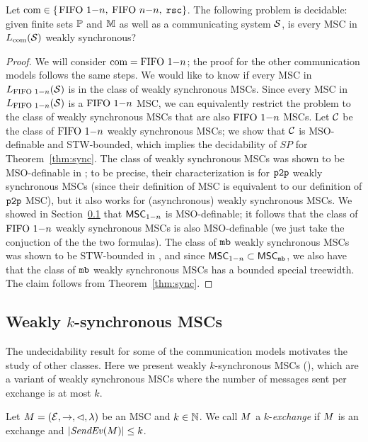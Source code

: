 \begin{proposition}\label{thm:weak-sync}
	Let $\textup{com} \in \{$$\text{FIFO } 1\mathsf{-}n, $ $\text{FIFO } n\mathsf{-}n, $ $\mathtt{rsc}\}$.
	The following problem is decidable:
	given finite sets $\mathbb{P}$ and $\mathbb{M}$ as well as a communicating system $\mathcal{S}$,
	is every MSC in $L_{\textup{com}}(\mathcal{S})$ weakly synchronous?
\end{proposition}
\begin{proof}
	We will consider $\textup{com} = \text{FIFO } 1\mathsf{-}n$; the proof for the other communication models follows the same steps. We would like to know if every MSC in $L_{\text{FIFO } 1\mathsf{-}n}(\mathcal{S})$ is in the class of weakly synchronous MSCs. Since every MSC in $L_{\text{FIFO } 1\mathsf{-}n}(\mathcal{S})$ is a $\text{FIFO } 1\mathsf{-}n$ MSC, we can equivalently restrict the problem to the class of weakly synchronous MSCs that are also $\text{FIFO } 1\mathsf{-}n$ MSCs. Let $\mathcal{C}$ be the class of $\text{FIFO } 1\mathsf{-}n$ weakly synchronous MSCs; we show that $\mathcal{C}$ is MSO-definable and STW-bounded, which implies the decidability of $SP$ for Theorem~\ref{thm:sync}. The class of weakly synchronous MSCs was shown to be MSO-definable in \cite{BolligFG21}; to be precise, their characterization is for $\mathtt{p2p}$ weakly synchronous MSCs (since their definition of MSC is equivalent to our definition of $\mathtt{p2p}$ MSC), but it also works for (asynchronous) weakly synchronous MSCs. We showed in Section~\ref{} that $\mathsf{MSC}_{1\mathsf{-}n}$ is MSO-definable; it follows that the class of $\text{FIFO } 1\mathsf{-}n$ weakly synchronous MSCs is also MSO-definable (we just take the conjuction of the the two formulas). The class of $\mathtt{mb}$ weakly synchronous MSCs was shown to be STW-bounded in \cite{BolligFG21}, and since $\mathsf{MSC}_{1\mathsf{-}n} \subset \mathsf{MSC}_{\mathtt{mb}}$, we also have that the class of $\mathtt{mb}$ weakly synchronous MSCs has a bounded special treewidth. The claim follows from Theorem~\ref{thm:sync}.
\end{proof}

\subsection{Weakly \texorpdfstring{$k$}{k}-synchronous MSCs}

The undecidability result for some of the communication models motivates the study of other classes. Here we present weakly $k$-synchronous MSCs (\cite{BolligFG21}), which are a variant of weakly synchronous MSCs where the number of messages sent per exchange is at most $k$.

\begin{definition}[$k$-exchange]\label{def:weak-k-synchr}
Let $M = (\mathcal{E},\to,\lhd,\lambda)$ be an MSC
and $k \in \mathbb{N}$.
We call $M$ a $k$-\emph{exchange} if
$M$ is an exchange and $|\mathit{SendEv}(M)| \le k$.
\end{definition}

